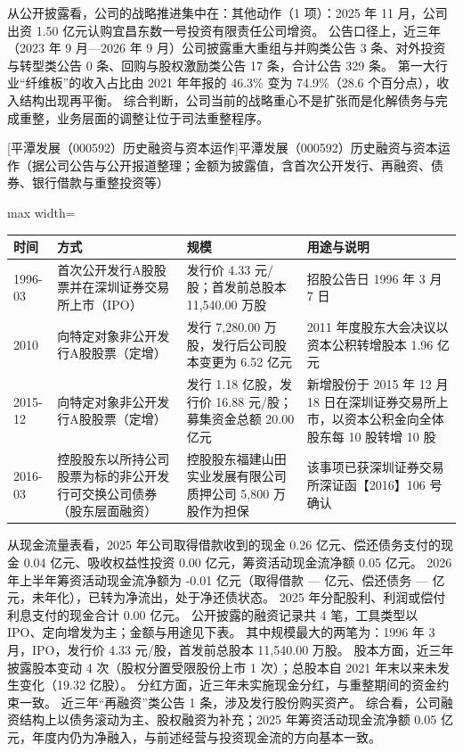  从公开披露看，公司的战略推进集中在：其他动作（1 项）：2025 年 11 月，公司出资 1.50 亿元认购宜昌东数一号投资有限责任公司增资。 公告口径上，近三年（2023 年 9 月---2026 年 9 月）公司披露重大重组与并购类公告 3 条、对外投资与转型类公告 0 条、回购与股权激励类公告 17 条，合计公告 329 条。 第一大行业“纤维板”的收入占比由 2021 年年报的 46.3\% 变为 74.9\%（28.6 个百分点），收入结构出现再平衡。 综合判断，公司当前的战略重心不是扩张而是化解债务与完成重整，业务层面的调整让位于司法重整程序。

\begin{center}\small\setlength{\tabcolsep}{4pt}
[平潭发展（000592）历史融资与资本运作]{平潭发展（000592）历史融资与资本运作（据公司公告与公开报道整理；金额为披露值，含首次公开发行、再融资、债券、银行借款与重整投资等）}
\begin{adjustbox}{max width=\textwidth}
\begin{tabular}{@{}p{1.45cm}p{2.55cm}p{4.05cm}p{4.95cm}@{}}
\toprule
时间 & 方式 & 规模 & 用途与说明 \\
\midrule
1996-03 & 首次公开发行A股股票并在深圳证券交易所上市（IPO） & 发行价 4.33 元/\allowbreak{}股；首发前总股本 11,\allowbreak{}540.00 万股 & 招股公告日 1996 年 3 月 7 日 \\
2010 & 向特定对象非公开发行A股股票（定增） & 发行 7,\allowbreak{}280.00 万股，\allowbreak{}发行后公司股本变更为 6.52 亿元 & 2011 年度股东大会决议以资本公积转增股本 1.96 亿元 \\
2015-12 & 向特定对象非公开发行A股股票（定增） & 发行 1.18 亿股，\allowbreak{}发行价 16.88 元/\allowbreak{}股；募集资金总额 20.00 亿元 & 新增股份于 2015 年 12 月 18 日在深圳证券交易所上市，\allowbreak{}以资本公积金向全体股东每 10 股转增 10 股 \\
2016-03 & 控股股东以所持公司股票为标的非公开发行可交换公司债券（股东层面融资） & 控股股东福建山田实业发展有限公司质押公司 5,\allowbreak{}800 万股作为担保 & 该事项已获深圳证券交易所深证函【2016】106 号确认 \\
\bottomrule
\end{tabular}
\end{adjustbox}
\end{center}

 从现金流量表看，2025 年公司取得借款收到的现金 0.26 亿元、偿还债务支付的现金 0.04 亿元、吸收权益性投资 0.00 亿元，筹资活动现金流净额 0.05 亿元。 2026 年上半年筹资活动现金流净额为 -0.01 亿元（取得借款 — 亿元、偿还债务 — 亿元，未年化），已转为净流出，处于净还债状态。 2025 年分配股利、利润或偿付利息支付的现金合计 0.00 亿元。 公开披露的融资记录共 4 笔，工具类型以 IPO、定向增发为主；金额与用途见下表。 其中规模最大的两笔为：1996 年 3 月，IPO，发行价 4.33 元/股，首发前总股本 11,540.00 万股。 股本方面，近三年披露股本变动 4 次（股权分置受限股份上市 1 次）；总股本自 2021 年末以来未发生变化（19.32 亿股）。 分红方面，近三年未实施现金分红，与重整期间的资金约束一致。 近三年“再融资”类公告 1 条，涉及发行股份购买资产。 综合看，公司融资结构上以债务滚动为主、股权融资为补充；2025 年筹资活动现金流净额 0.05 亿元，年度内仍为净融入，与前述经营与投资现金流的方向基本一致。

